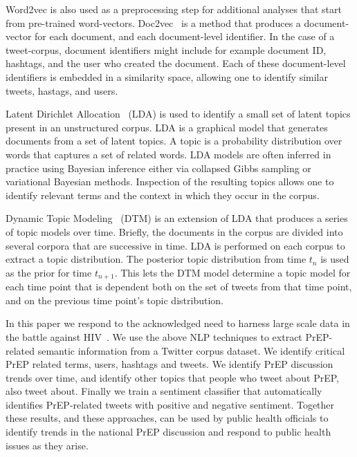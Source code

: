 \documentclass{sig-alternate-05-2015}
\begin{document}
Word2vec is also used as a preprocessing step for additional analyses that start from pre-trained word-vectors. Doc2vec~\cite{le2014distributed} is a method that produces a document-vector for each document, and each document-level identifier. In the case of a tweet-corpus, document identifiers might include for example document ID, hashtags, and the user who created the document. Each of these document-level identifiers is embedded in a similarity space, allowing one to identify similar tweets, hastags, and users.

Latent Dirichlet Allocation~\cite{blei2003latent} (LDA) is used to identify a small set of latent topics present in an unstructured corpus. LDA is a graphical model that generates documents from a set of latent topics. A topic is a probability distribution over words that captures a set of related words. LDA models are often inferred in practice using Bayesian inference either via collapsed Gibbs sampling or variational Bayesian methods. Inspection of the resulting topics allows one to identify relevant terms and the context in which they occur in the corpus. 

Dynamic Topic Modeling~\cite{blei2006dynamic} (DTM) is an extension of LDA that produces a series of topic models over time. Briefly, the documents in the corpus are divided into several corpora that are successive in time. LDA is performed on each corpus to extract a topic distribution. The posterior topic distribution from time $t_n$ is used as the prior for time $t_{n+1}$. This lets the DTM model determine a topic model for each time point that is dependent both on the set of tweets from that time point, and on the previous time point's topic distribution.

In this paper we respond to the acknowledged need to harness large scale data in the battle against HIV~\cite{young2015big}. We use the above NLP techniques to extract PrEP-related semantic information from a Twitter corpus dataset. We identify critical PrEP related terms, users, hashtags and tweets. We identify PrEP discussion trends over time, and identify other topics that people who tweet about PrEP, also tweet about. Finally we train a sentiment classifier that automatically identifies PrEP-related tweets with positive and negative sentiment. Together these results, and these approaches, can be used by public health officials to identify trends in the national PrEP discussion and respond to public health issues as they arise.
\end{document}
